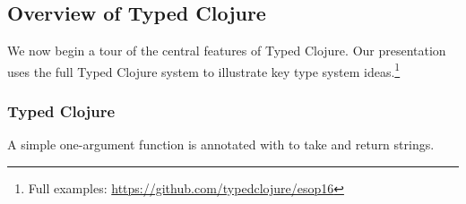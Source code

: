\subsection{Overview of Typed Clojure}

\label{sec:overview}

We now begin a tour of the central features of Typed Clojure.
Our presentation
uses the full Typed Clojure system to illustrate key type system
ideas.\footnote{Full examples: \url{https://github.com/typedclojure/esop16}}

%

%
%
%

\subsubsection{Typed Clojure}

A simple one-argument function  is annotated with  to take and return strings.

